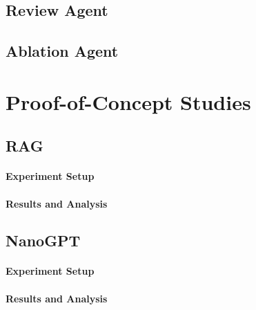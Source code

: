 \documentclass{article}
\begin{document}

\subsection{Review Agent}


\subsection{Ablation Agent}


\section{Proof-of-Concept Studies}


\subsection{RAG} %

\paragraph{Experiment Setup}

\paragraph{Results and Analysis}

\subsection{NanoGPT} %

\paragraph{Experiment Setup}

\paragraph{Results and Analysis}
\end{document}
